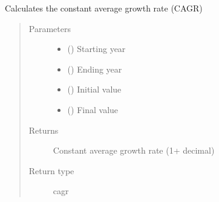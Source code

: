 \documentclass[a4paper,12pt,english]{article}
\begin{document}
\begin{fulllineitems}
\begin{fulllineitems}
\begin{quote}
\begin{description}
\end{description}\end{quote}

\end{fulllineitems}


\begin{fulllineitems}
\label{\detokenize{GOCPI:GOCPI.Forecasting.Forecasting.calculate_constant_average_growth_rate}}
Calculates the constant average growth rate (CAGR)
\begin{quote}\begin{description}
\item[{Parameters}] \leavevmode\begin{itemize}
\item {} 
 () \textendash{} Starting year

\item {} 
 () \textendash{} Ending year

\item {} 
 () \textendash{} Initial value

\item {} 
 () \textendash{} Final value

\end{itemize}

\item[{Returns}] \leavevmode
Constant average growth rate (1+ decimal)

\item[{Return type}] \leavevmode
cagr

\end{description}\end{quote}

\end{fulllineitems}


\end{fulllineitems}
\end{document}
